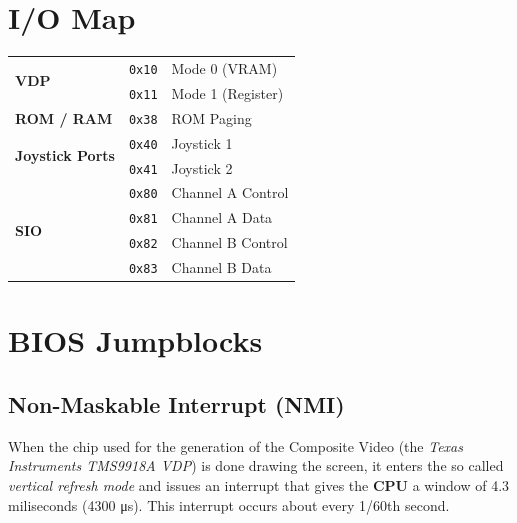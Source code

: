 \documentclass[a4paper,11pt]{article}
\begin{document}
    \pagebreak
    \section{I/O Map}

    \begin{tabular}{l l l }
        \hline
        \multirow{2}{*}{\textbf{VDP}} & \texttt{0x10} & Mode 0 (VRAM)\\
        & \texttt{0x11} & Mode 1 (Register)\\
        \hline
        \textbf{ROM / RAM} & \texttt{0x38} & ROM Paging\\
        \hline
        \multirow{2}{*}{\textbf{Joystick Ports}} & \texttt{0x40} 
        & Joystick 1\\
        & \texttt{0x41} & Joystick 2\\
        \hline
        \multirow{4}{*}{\textbf{SIO}} & \texttt{0x80} & Channel A Control\\
        & \texttt{0x81} & Channel A Data\\
        & \texttt{0x82} & Channel B Control\\
        & \texttt{0x83} & Channel B Data\\
        \hline
    \end{tabular}

    \pagebreak
    \section{BIOS Jumpblocks}

    \subsection{Non-Maskable Interrupt (NMI)}
    \label{sec:nmi}

    When the chip used for the generation of the Composite Video (the \textit{Texas
    Instruments TMS9918A VDP}) is done drawing the screen, it enters the so
    called \textit{vertical refresh mode} and issues an interrupt that gives the
    \textbf{CPU} a window of 4.3 miliseconds (4300 \si{\micro\second}). This
    interrupt occurs about every 1/60th second.
\end{document}
